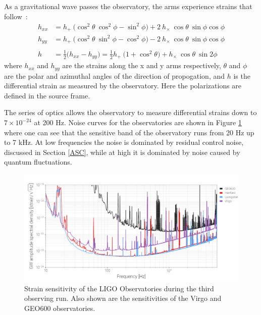 \documentclass [12pt, proquest]{uwthesis}[2019]
\begin{document}
\pagebreak
As a gravitational wave passes the observatory, the arms experience strains that follow~\cite{GWBook}:
\begin{align}
h_{xx}&=h_+\ \big( \cos^2\theta\ \cos^2\phi-\sin^2\phi \big)+2\ h_\times\ \cos \theta\ \sin \phi \cos \phi \\
h_{yy}&=h_+\ \big( \cos^2\theta\ \sin^2\phi-\cos^2\phi \big)-2\ h_\times\ \cos \theta\ \sin \phi \cos \phi \\
\nonumber \\
h&=\frac{1}{2} \big( h_{xx}-h_{yy} \big)=\frac{1}{2}h_+\ \big( 1+\cos^2\theta \big)+ h_\times\ \cos \theta\ \sin 2 \phi 
\end{align}
where $h_{xx}$ and $h_{yy}$ are the strains along the x and y arms respectively, $\theta$ and $\phi$ are the polar and azimuthal angles of the direction of propogation, and $h$ is the differential strain as measured by the observatory. Here the polarizations are defined in the source frame.

The series of optics allows the observatory to measure differential strains down to $7\times10^{-24}$ at 200 Hz.  Noise curves for the observatories are shown in Figure \ref{LIGO_Strain} where one can see that the sensitive band of the observatory runs from 20 Hz up to 7 kHz. At low frequencies the noise is dominated by residual control noise, discussed in Section \ref{ASC}, while at high it is dominated by noise caused by quantum fluctuations. ~\cite{Squeeze}

\begin{figure}[!h]
\begin{center}
\includegraphics[width=\textwidth]{LIGOSens.png}
\caption[Strain sensitivity of the LIGO and Virgo Observatories]{Strain sensitivity of the LIGO Observatories during the third observing run. Also shown are the sensitivities of the Virgo and GEO600 observatories.~\cite{LIGOopen}}
\label{LIGO_Strain}
\end{center}
\end{figure}
\end{document}
